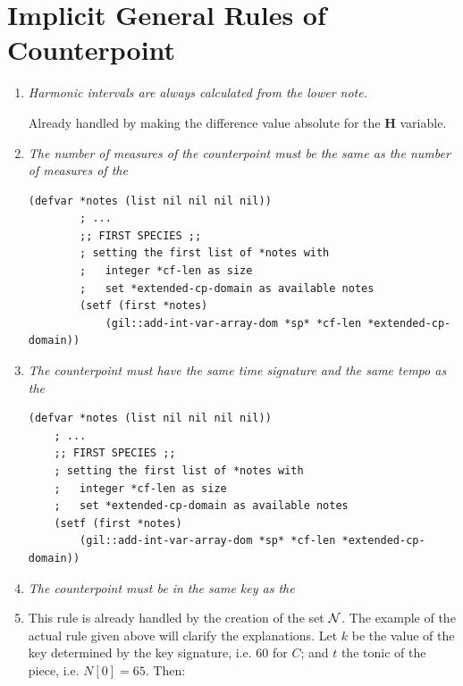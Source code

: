 \section*{Implicit General Rules of Counterpoint}


\begin{enumerate}[wide, label=\bfseries G\arabic*]
    \item \textit{Harmonic intervals are always calculated from the lower note.} \label{rule:hfromlower}

    Already handled by making the difference value absolute for the \textbf{H} variable. 

    \item \textit{The number of measures of the counterpoint must be the same as the number of measures of the \cfdot} \label{rule:sameNbMeasures}

    \begin{lstlisting}[caption=Definition of $N$ in the first species., label=lst:defcp, basicstyle=\ttfamily\small]
        (defvar *notes (list nil nil nil nil))
        ; ...
        ;; FIRST SPECIES ;;
        ; setting the first list of *notes with
        ;   integer *cf-len as size
        ;   set *extended-cp-domain as available notes
        (setf (first *notes)
            (gil::add-int-var-array-dom *sp* *cf-len *extended-cp-domain))
        \end{lstlisting}

    \item \textit{The counterpoint must have the same time signature and the same tempo as the \cfdot} \label{rule:sameTimeSignature}

    \begin{lstlisting}[caption=Definition of $N$ in the first species., label=lst:defcp, basicstyle=\ttfamily\small]
    (defvar *notes (list nil nil nil nil))
    ; ...
    ;; FIRST SPECIES ;;
    ; setting the first list of *notes with
    ;   integer *cf-len as size
    ;   set *extended-cp-domain as available notes
    (setf (first *notes)
        (gil::add-int-var-array-dom *sp* *cf-len *extended-cp-domain))
    \end{lstlisting}
    
    \item \textit{The counterpoint must be in the same key as the \cfdot}\label{rule:samekey}
    \item 
    This rule is already handled by the creation of the set $\mathcal{N}$. The example of the actual rule given above will clarify the explanations. Let $k$ be the value of the key determined by the key signature, i.e. $60$ for $C$; and $t$ the tonic of the piece, i.e. $N[0]=65$. Then:


\end{enumerate}

